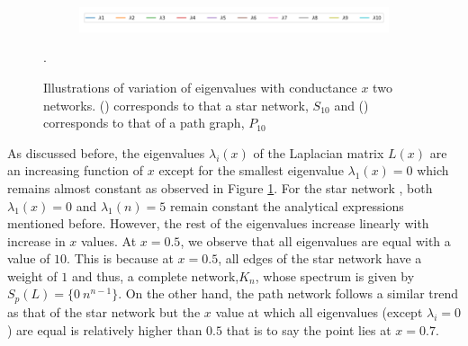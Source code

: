 \documentclass[10pt,a4paper]{article}
\begin{document}
\begin{figure}[H]
		    	\begin{subfigure}[b]{0.85\textwidth}
		    		\includegraphics[width= \textwidth]{images/legend-eigenvalues.png}
		    	\end{subfigure}
		    	\caption{Illustrations of variation of eigenvalues with conductance $x$ two networks.
		    		() corresponds to that a star network, $S_{10}$ and  () corresponds to that of a path graph, $P_{10}$}.
		    	\label{eigen-xvalues}
		    \end{figure}
		    As discussed before, the eigenvalues $\lambda_i(x)$ of the Laplacian matrix $L(x)$ are an increasing function of $x$ except for the smallest eigenvalue $\lambda_1(x) = 0$ which remains almost constant as observed in Figure \ref{eigen-xvalues}. For the star network , both $\lambda_1(x) = 0$ and $\lambda_1(n) = 5$ remain constant the analytical expressions mentioned before. However, the rest of the eigenvalues increase linearly with increase in $x$ values. At $x=0.5$, we observe that all eigenvalues are equal with a value of $10$. This is because at $x=0.5$, all edges of the star network have a weight of $1$ and thus, a complete network,$K_n$, whose spectrum is given by $S_p(L) = \{0~ n^{n-1} \}$. On the other hand, the path network follows a similar trend as that of the star network but the $x$ value at which all eigenvalues (except $\lambda_i=0$) are equal is relatively higher than $0.5$ that is to say the point lies at $x=0.7$. 
\end{document}
